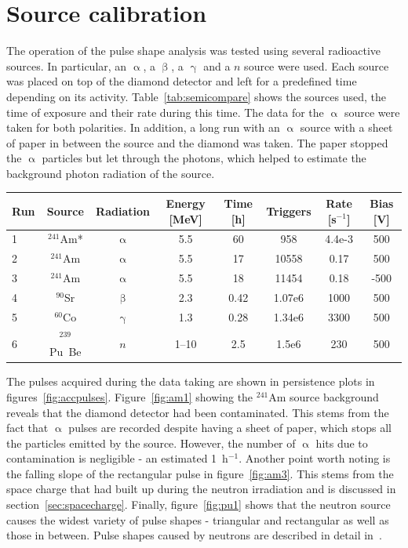 \documentclass[12pt]{packages/mytustyle}  %
\begin{document}
\section{Source calibration}
\label{sec:sourcecalib}
The operation of the pulse shape analysis was tested using several radioactive sources. In particular, an $\upalpha$, a $\upbeta$, a $\upgamma$ and a $n$ source were used. Each source was placed on top of the diamond detector and left for a predefined time depending on its activity. Table~\ref{tab:semicompare} shows the sources used, the time of exposure and their rate during this time. The data for the $\upalpha$ source were taken for both polarities. In addition, a long run with an $\upalpha$ source with a sheet of paper in between the source and the diamond was taken. The paper stopped the $\upalpha$ particles but let through the photons, which helped to estimate the background photon radiation of the source.

\begin{footnotesize}
\begin{center}
\begin{tabular}{l c c c c c c c}
\hline
Run & Source & Radiation & Energy [MeV] & Time [h]  & Triggers & Rate [s$^{-1}$]  & Bias [V]   \\
\hline
1&$^{241}$Am*  & $\upalpha$ & 5.5 & 60 & 958 & 4.4e-3  & 500 \\
2&$^{241}$Am  & $\upalpha$ & 5.5 & 17 & 10558 & 0.17  & 500 \\
3&$^{241}$Am  & $\upalpha$ & 5.5 & 18 & 11454 & 0.18 & -500 \\
4&$^{90}$Sr  & $\upbeta$ & 2.3 & 0.42 & 1.07e6 & 1000 & 500 \\
5&$^{60}$Co  & $\upgamma$ & 1.3 & 0.28 & 1.34e6 & 3300 & 500 \\
6&$^{239}$Pu~Be  & $n$ & 1--10 & 2.5 & 1.5e6 & 230 & 500 \\ \hline
\end{tabular}
\label{tab:semicompare}
\end{center}
\end{footnotesize}

The pulses acquired during the data taking are shown in persistence plots in figures~\ref{fig:accpulses}. Figure~\ref{fig:am1} showing the $^{241}$Am source background reveals that the diamond detector had been contaminated. This stems from the fact that $\upalpha$ pulses are recorded despite having a sheet of paper, which stops all the particles emitted by the source. However, the number of $\upalpha$ hits due to contamination is negligible - an estimated 1~h$^{-1}$. Another point worth noting is the falling slope of the rectangular pulse in figure~\ref{fig:am3}. This stems from the space charge that had built up during the neutron irradiation and is discussed in section~\ref{sec:spacecharge}. Finally, figure~\ref{fig:pu1} shows that the neutron source causes the widest variety of pulse shapes - triangular and rectangular as well as those in between. Pulse shapes caused by neutrons are described in detail in~\cite{}.
\end{document}
